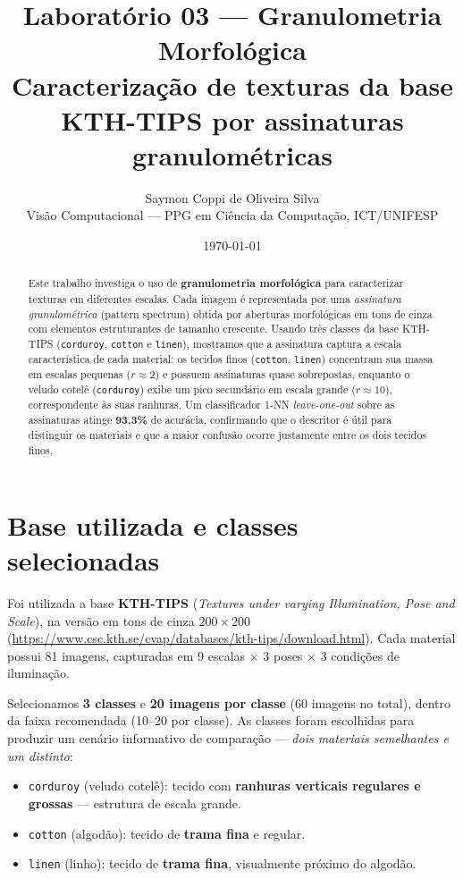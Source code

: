 \documentclass[11pt,a4paper]{article}
\title{\textbf{Laboratório 03 --- Granulometria Morfológica}\\[0.3em]
\large Caracterização de texturas da base KTH-TIPS por assinaturas granulométricas}
\author{Saymon Coppi de Oliveira Silva\\ \small Visão Computacional --- PPG em Ciência da Computação, ICT/UNIFESP}
\date{\today}
\begin{document}
\maketitle

\begin{abstract}
\noindent Este trabalho investiga o uso de \textbf{granulometria morfológica} para
caracterizar texturas em diferentes escalas. Cada imagem é representada por uma
\emph{assinatura granulométrica} (pattern spectrum) obtida por aberturas
morfológicas em tons de cinza com elementos estruturantes de tamanho crescente.
Usando três classes da base KTH-TIPS (\texttt{corduroy}, \texttt{cotton} e
\texttt{linen}), mostramos que a assinatura captura a escala característica de
cada material: os tecidos finos (\texttt{cotton}, \texttt{linen}) concentram sua
massa em escalas pequenas ($r\!\approx\!2$) e possuem assinaturas quase
sobrepostas, enquanto o veludo cotelê (\texttt{corduroy}) exibe um pico
secundário em escala grande ($r\!\approx\!10$), correspondente às suas ranhuras.
Um classificador 1-NN \emph{leave-one-out} sobre as assinaturas atinge
\textbf{93{,}3\%} de acurácia, confirmando que o descritor é útil para
distinguir os materiais e que a maior confusão ocorre justamente entre os dois
tecidos finos.
\end{abstract}

\section{Base utilizada e classes selecionadas}

Foi utilizada a base \textbf{KTH-TIPS} (\emph{Textures under varying Illumination,
Pose and Scale}), na versão em tons de cinza $200\times200$
(\url{https://www.csc.kth.se/cvap/databases/kth-tips/download.html}). Cada
material possui 81 imagens, capturadas em 9 escalas $\times$ 3 poses $\times$ 3
condições de iluminação.

Selecionamos \textbf{3 classes} e \textbf{20 imagens por classe} (60 imagens no
total), dentro da faixa recomendada (10--20 por classe). As classes foram
escolhidas para produzir um cenário informativo de comparação --- \emph{dois
materiais semelhantes e um distinto}:

\begin{itemize}
  \item \texttt{corduroy} (veludo cotelê): tecido com \textbf{ranhuras verticais
        regulares e grossas} --- estrutura de escala grande.
  \item \texttt{cotton} (algodão): tecido de \textbf{trama fina} e regular.
  \item \texttt{linen} (linho): tecido de \textbf{trama fina}, visualmente
        próximo do algodão.
\end{itemize}
\end{document}

